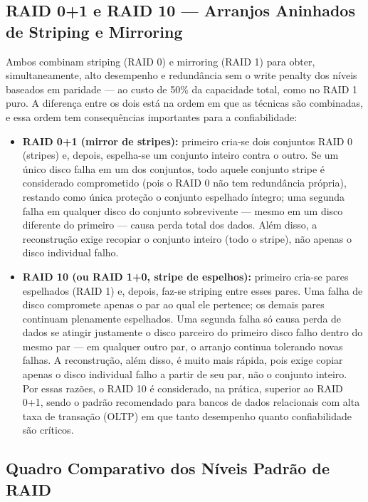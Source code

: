 \documentclass[11pt,a4paper]{article}
\begin{document}
\subsection{RAID 0+1 e RAID 10 --- Arranjos Aninhados de Striping e Mirroring}
Ambos combinam striping (RAID 0) e mirroring (RAID 1) para obter, simultaneamente, alto desempenho e redundância sem o write penalty dos níveis baseados em paridade --- ao custo de 50\% da capacidade total, como no RAID 1 puro. A diferença entre os dois está na ordem em que as técnicas são combinadas, e essa ordem tem consequências importantes para a confiabilidade:
\begin{itemize}[leftmargin=*]
    \item \textbf{RAID 0+1 (mirror de stripes):} primeiro cria-se dois conjuntos RAID 0 (stripes) e, depois, espelha-se um conjunto inteiro contra o outro. Se um único disco falha em um dos conjuntos, todo aquele conjunto stripe é considerado comprometido (pois o RAID 0 não tem redundância própria), restando como única proteção o conjunto espelhado íntegro; uma segunda falha em qualquer disco do conjunto sobrevivente --- mesmo em um disco diferente do primeiro --- causa perda total dos dados. Além disso, a reconstrução exige recopiar o conjunto inteiro (todo o stripe), não apenas o disco individual falho.
    \item \textbf{RAID 10 (ou RAID 1+0, stripe de espelhos):} primeiro cria-se pares espelhados (RAID 1) e, depois, faz-se striping entre esses pares. Uma falha de disco compromete apenas o par ao qual ele pertence; os demais pares continuam plenamente espelhados. Uma segunda falha só causa perda de dados se atingir justamente o disco parceiro do primeiro disco falho dentro do mesmo par --- em qualquer outro par, o arranjo continua tolerando novas falhas. A reconstrução, além disso, é muito mais rápida, pois exige copiar apenas o disco individual falho a partir de seu par, não o conjunto inteiro. Por essas razões, o RAID 10 é considerado, na prática, superior ao RAID 0+1, sendo o padrão recomendado para bancos de dados relacionais com alta taxa de transação (OLTP) em que tanto desempenho quanto confiabilidade são críticos.
\end{itemize}

\subsection{Quadro Comparativo dos Níveis Padrão de RAID}
\end{document}
